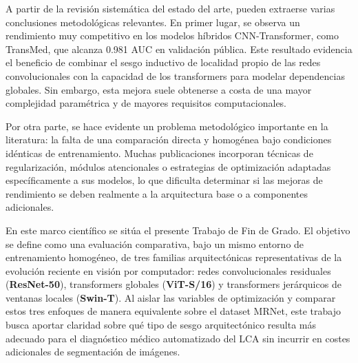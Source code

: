 A partir de la revisión sistemática del estado del arte, pueden extraerse varias conclusiones metodológicas relevantes. En primer lugar, se observa un rendimiento muy competitivo en los modelos híbridos CNN-Transformer, como TransMed, que alcanza 0.981 AUC en validación pública. Este resultado evidencia el beneficio de combinar el sesgo inductivo de localidad propio de las redes convolucionales con la capacidad de los transformers para modelar dependencias globales. Sin embargo, esta mejora suele obtenerse a costa de una mayor complejidad paramétrica y de mayores requisitos computacionales.

Por otra parte, se hace evidente un problema metodológico importante en la literatura: la falta de una comparación directa y homogénea bajo condiciones idénticas de entrenamiento. Muchas publicaciones incorporan técnicas de regularización, módulos atencionales o estrategias de optimización adaptadas específicamente a sus modelos, lo que dificulta determinar si las mejoras de rendimiento se deben realmente a la arquitectura base o a componentes adicionales.

En este marco científico se sitúa el presente Trabajo de Fin de Grado. El objetivo se define como una evaluación comparativa, bajo un mismo entorno de entrenamiento homogéneo, de tres familias arquitectónicas representativas de la evolución reciente en visión por computador: redes convolucionales residuales (\textbf{ResNet-50}), transformers globales (\textbf{ViT-S/16}) y transformers jerárquicos de ventanas locales (\textbf{Swin-T}). Al aislar las variables de optimización y comparar estos tres enfoques de manera equivalente sobre el dataset MRNet, este trabajo busca aportar claridad sobre qué tipo de sesgo arquitectónico resulta más adecuado para el diagnóstico médico automatizado del LCA sin incurrir en costes adicionales de segmentación de imágenes.
